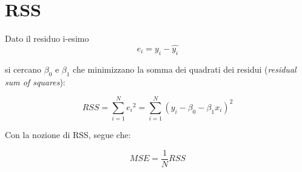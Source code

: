 \section{RSS}
\label{rss}

Dato il residuo i-esimo
\begin{equation}
e_i = y_i - \hat{y_i}
\end{equation}

si cercano ${\beta}_0$ e ${\beta}_1$ che minimizzano la somma dei quadrati dei residui (\textit{residual sum of squares}):

\begin{equation}
RSS =  \sum_{i=1}^N {e_i}^2 = \sum_{i=1}^N (y_i - {\beta}_0 - {\beta_1}x_i)^2
\end{equation}

Con la nozione di RSS, segue che:

\begin{equation}
MSE = \frac{1}{N}RSS
\end{equation}
